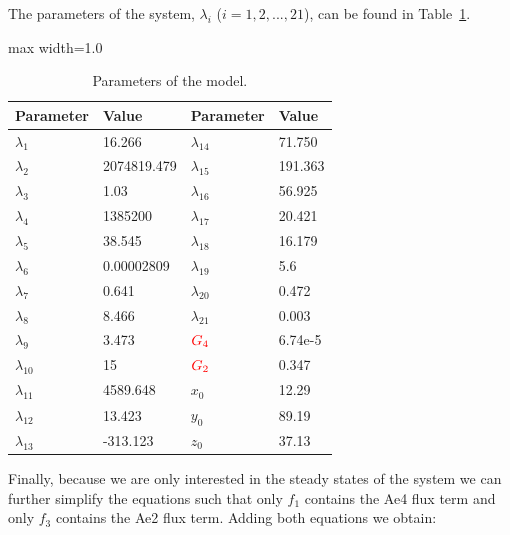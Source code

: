 \documentclass{svjour3}
\begin{document}
The parameters of the system, $\lambda_i$ ($i=1,2,...,21$), can be found in Table~\ref{table:lambda}.
\begin{table}[H]
\centering
\captionsetup{justification=centering} 
\caption{Parameters of the model.}
\begin{adjustbox}{max width=1.0\textwidth}
\begin{tabular}{@{}llll@{}}
\toprule
\bf{Parameter}	& \bf{Value}	 	&\bf{Parameter} 			& \bf{Value}		\\ \midrule
$\lambda_1$		& 16.266			& $\lambda_{14}$			& 71.750	 		\\ 
$\lambda_2$		& 2074819.479	& $\lambda_{15}$			& 191.363		\\
$\lambda_3$ 		& 1.03			& $\lambda_{16}$			& 56.925	 		\\
$\lambda_4$ 		& 1385200		& $\lambda_{17}$			& 20.421			\\
$\lambda_5$ 		& 38.545			& $\lambda_{18}$			& 16.179			\\	
$\lambda_6$ 		& 0.00002809		& $\lambda_{19}$ 		& 5.6			\\	
$\lambda_7$		& 0.641			& $\lambda_{20}$			& 0.472			\\
$\lambda_8$		& 8.466			& $\lambda_{21}$			& 0.003			\\
$\lambda_9$		& 3.473			& ${\color{red}G_{4}}$	& 6.74e-5		\\		
$\lambda_{10}$	& 15	 			& ${\color{red}G_{2}}$	& 0.347			\\
$\lambda_{11}$ 	& 4589.648		& $x_0$ 					& 12.29	 		\\
$\lambda_{12}$	& 13.423			& $y_0$ 					& 89.19			\\
$\lambda_{13}$	& -313.123		& $z_0$ 					& 37.13			\\ 										
\bottomrule
\end{tabular}
\end{adjustbox}
\label{table:lambda}
\end{table}
Finally, because we are only interested in the steady states of the system we can further simplify the equations such that only $f_1$ contains the Ae4 flux term and only $f_3$ contains the Ae2 flux term. Adding both equations we obtain: \par
\end{document}

